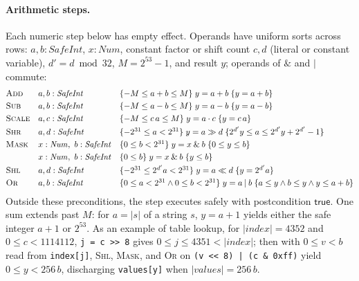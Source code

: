 \documentclass[10pt,a4paper]{article}
\theoremstyle{definition}
\theoremstyle{remark}
\newcommand{\kw}[1]{\mathsf{#1}}
\newcommand{\len}[1]{|#1|}
\newcommand{\hoare}[3]{\{#1\}\;#2\;\{#3\}}
\newcommand{\code}[1]{\texttt{#1}}
\begin{document}
\paragraph{Arithmetic steps.}
Each numeric step below has empty effect. Operands have uniform sorts
across rows: $a,b:\mathit{SafeInt}$, $x:\mathit{Num}$, constant factor or
shift count $c,d$ (literal or constant variable), $d'=d\bmod 32$,
$M=2^{53}-1$, and result $y$; operands of $\mathbin{\&}$ and $\mathbin{|}$
commute:
{\small\begin{displaymath}
\begin{array}{@{}lll@{}}
\textsc{Add} & a,b:\mathit{SafeInt} & \hoare{-M\le a+b\le M}{y=a+b}{y=a+b}\\[3pt]
\textsc{Sub} & a,b:\mathit{SafeInt} & \hoare{-M\le a-b\le M}{y=a-b}{y=a-b}\\[3pt]
\textsc{Scale} & a,c:\mathit{SafeInt} & \hoare{-M\le c\,a\le M}{y=a\cdot c}{y=c\,a}\\[3pt]
\textsc{Shr} & a,d:\mathit{SafeInt} & \hoare{-2^{31}\le a<2^{31}}{y=a\gg d}{2^{d'}y\le a\le 2^{d'}y+2^{d'}-1}\\[3pt]
\textsc{Mask} & x:\mathit{Num},\ b:\mathit{SafeInt} & \hoare{0\le b<2^{31}}{y=x\mathbin{\&}b}{0\le y\le b}\\[3pt]
 & x:\mathit{Num},\ b:\mathit{SafeInt} & \hoare{0\le b}{y=x\mathbin{\&}b}{y\le b}\\[3pt]
\textsc{Shl} & a,d:\mathit{SafeInt} & \hoare{-2^{31}\le 2^{d'}a<2^{31}}{y=a\ll d}{y=2^{d'}a}\\[3pt]
\textsc{Or} & a,b:\mathit{SafeInt} & \hoare{0\le a<2^{31}\wedge 0\le b<2^{31}}{y=a\mathbin{|}b}{a\le y\wedge b\le y\wedge y\le a+b}
\end{array}
\end{displaymath}}
Outside these preconditions, the step executes safely with postcondition
$\kw{true}$. One sum extends past $M$: for $a=\len s$ of a string $s$,
$y=a+1$ yields either the safe integer $a+1$ or $2^{53}$. As an example
of table lookup, for $\len{\mathit{index}}=4352$ and $0\le c<1114112$,
\code{j = c >> 8} gives $0\le j\le 4351<\len{\mathit{index}}$; then with
$0\le v<b$ read from \code{index[j]}, \textsc{Shl}, \textsc{Mask}, and
\textsc{Or} on \code{(v << 8) | (c \& 0xff)} yield $0\le y<256\,b$,
discharging \code{values[y]} when $\len{\mathit{values}}=256\,b$.
\end{document}
